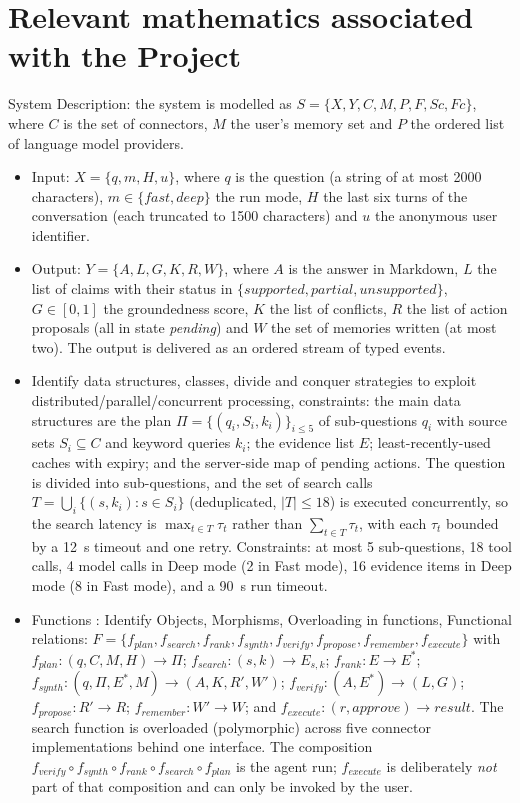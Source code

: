 \documentclass[oneside,a4paper,12pt]{report}
\begin{document}
\section{Relevant mathematics associated with the Project}
\label{sec:math}
System Description: the system is modelled as $S = \{X, Y, C, M, P, F, Sc, Fc\}$, where $C$ is the set of connectors, $M$ the user's memory set and $P$ the ordered list of language model providers.
\begin{itemize}
\item Input: $X = \{q, m, H, u\}$, where $q$ is the question (a string of at most 2000 characters), $m \in \{\mathit{fast}, \mathit{deep}\}$ the run mode, $H$ the last six turns of the conversation (each truncated to 1500 characters) and $u$ the anonymous user identifier.
\item Output: $Y = \{A, L, G, K, R, W\}$, where $A$ is the answer in Markdown, $L$ the list of claims with their status in $\{\mathit{supported}, \mathit{partial}, \mathit{unsupported}\}$, $G \in [0,1]$ the groundedness score, $K$ the list of conflicts, $R$ the list of action proposals (all in state \emph{pending}) and $W$ the set of memories written (at most two). The output is delivered as an ordered stream of typed events.
\item Identify data structures, classes, divide and conquer strategies to exploit distributed/\allowbreak{}parallel/\allowbreak{}concurrent processing, constraints: the main data structures are the plan $\Pi = \{(q_i, S_i, k_i)\}_{i \le 5}$ of sub-questions $q_i$ with source sets $S_i \subseteq C$ and keyword queries $k_i$; the evidence list $E$; least-recently-used caches with expiry; and the server-side map of pending actions. The question is divided into sub-questions, and the set of search calls $T = \bigcup_i \{(s, k_i) : s \in S_i\}$ (deduplicated, $|T| \le 18$) is executed concurrently, so the search latency is $\max_{t \in T} \tau_t$ rather than $\sum_{t \in T} \tau_t$, with each $\tau_t$ bounded by a 12~s timeout and one retry. Constraints: at most 5 sub-questions, 18 tool calls, 4 model calls in Deep mode (2 in Fast mode), 16 evidence items in Deep mode (8 in Fast mode), and a 90~s run timeout.
\item Functions : Identify Objects, Morphisms, Overloading in functions, Functional relations: $F = \{f_{plan}, \allowbreak f_{search}, \allowbreak f_{rank}, \allowbreak f_{synth}, \allowbreak f_{verify}, \allowbreak f_{propose}, \allowbreak f_{remember}, \allowbreak f_{execute}\}$ with $f_{plan}: (q, C, M, H) \rightarrow \Pi$; $f_{search}: (s, k) \rightarrow E_{s,k}$; $f_{rank}: E \rightarrow E^{*}$; $f_{synth}: (q, \Pi, E^{*}, M) \rightarrow (A, K, R', W')$; $f_{verify}: (A, E^{*}) \rightarrow (L, G)$; $f_{propose}: R' \rightarrow R$; $f_{remember}: W' \rightarrow W$; and $f_{execute}: (r, \mathit{approve}) \rightarrow \mathit{result}$. The search function is overloaded (polymorphic) across five connector implementations behind one interface. The composition $f_{verify} \circ f_{synth} \circ f_{rank} \circ f_{search} \circ f_{plan}$ is the agent run; $f_{execute}$ is deliberately \emph{not} part of that composition and can only be invoked by the user.

\end{itemize}
\end{document}
